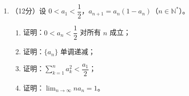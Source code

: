 \documentclass[12pt, a4paper]{ctexart}
\begin{document}
\begin{enumerate}[resume]
\item （12分）设 $0 < a_1 < \dfrac{1}{2}$，$a_{n+1} = a_n(1 - a_n)$（$n \in \mathbb{N}^*$）。
\begin{enumerate}[label=(\arabic*)]
\item 证明：$0 < a_n < \dfrac{1}{2}$ 对所有 $n$ 成立；
\item 证明：$\{a_n\}$ 单调递减；
\item 证明：$\displaystyle\sum_{k=1}^{n} a_k^2 < \dfrac{a_1}{2}$；
\item 证明：$\displaystyle\lim_{n \to \infty} na_n = 1$。
\end{enumerate}

\end{enumerate}
\end{document}
